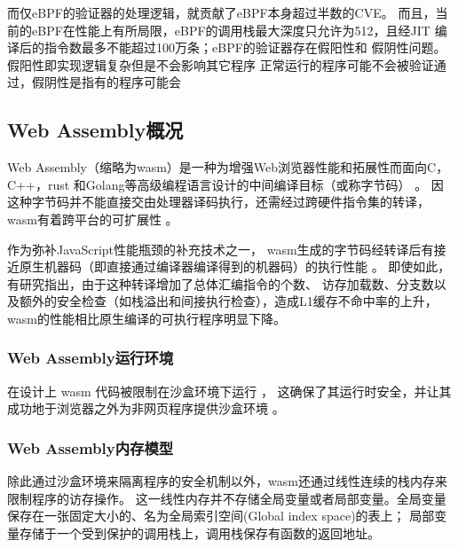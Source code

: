     而仅eBPF的验证器的处理逻辑，就贡献了eBPF本身超过半数的CVE\cite{hive}。
    而且，当前的eBPF在性能上有所局限，eBPF的调用栈最大深度只允许为512，且经JIT
    编译后的指令数最多不能超过100万条；eBPF的验证器存在假阳性\cite{hive}和
    假阴性问题\cite{RJXB202312023}。假阳性即实现逻辑复杂但是不会影响其它程序
    正常运行的程序可能不会被验证通过，假阴性是指有的程序可能会

\subsection{Web Assembly概况}
    Web Assembly（缩略为wasm）是一种为增强Web浏览器性能和拓展性而面向C，C++，rust
    和Golang等高级编程语言设计的中间编译目标（或称字节码）
    \cite{wasmCommunityGroup, lehmannWasabiFrameworkDynamically2019, lehmannEverythingOldNew, bhansaliFirstLookCode2022, waseemIssuesTheirCauses2024}。
    因这种字节码并不能直接交由处理器译码执行，还需经过跨硬件指令集的转译，wasm有着跨平台的可扩展性
    \cite{lehmannEverythingOldNew, waseemIssuesTheirCauses2024, lehmannWasabiFrameworkDynamically2019, JayProvablySafe, WebAssemblySummaryOnSecurity, rayOverviewWebAssemblyIoT2023}。

    作为弥补JavaScript性能瓶颈的补充技术之一\cite{rayOverviewWebAssemblyIoT2023}，
    wasm生成的字节码经转译后有接近原生机器码（即直接通过编译器编译得到的机器码）的执行性能
    \cite{haasBringingWebSpeed2017,johnsonWaVeVerifiablySecure2023}。
    即使如此，有研究\cite{JangdaNotsoFast}指出，由于这种转译增加了总体汇编指令的个数、
    访存加载数、分支数以及额外的安全检查（如栈溢出和间接执行检查），造成L1缓存不命中率的上升，
    wasm的性能相比原生编译的可执行程序明显下降。

\subsubsection{Web Assembly运行环境}
    在设计上 wasm 代码被限制在沙盒环境下运行
    \cite{johnsonWaVeVerifiablySecure2023,WasmbpfStreamliningEBPF2024}，
    这确保了其运行时安全，并让其成功地于浏览器之外为非网页程序提供沙盒环境
    \cite{narayanSwivelHardeningWebAssembly, WebAssemblySummaryOnSecurity, 9156135}。

\subsubsection{Web Assembly内存模型}
    除此通过沙盒环境来隔离程序的安全机制以外，wasm还通过线性连续的栈内存来限制程序的访存操作。
    这一线性内存并不存储全局变量或者局部变量。全局变量保存在一张固定大小的、名为全局索引空间(Global index space)的表上；
    局部变量存储于一个受到保护的调用栈上，调用栈保存有函数的返回地址。

